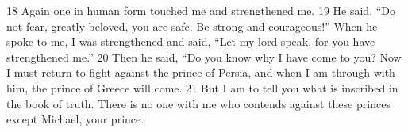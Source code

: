 18 Again one in human form touched me and strengthened me. 19 He said, ``Do 
not fear, greatly beloved, you are safe. Be strong and courageous!'' When he 
spoke to me, I was strengthened and said, ``Let my lord speak, for you have 
strengthened me.'' 20 Then he said, ``Do you know why I have come to you? Now 
I must return to fight against the prince of Persia, and when I am through 
with him, the prince of Greece will come. 21 But I am to tell you what is 
inscribed in the book of truth. There is no one with me who contends against 
these princes except Michael, your prince.
